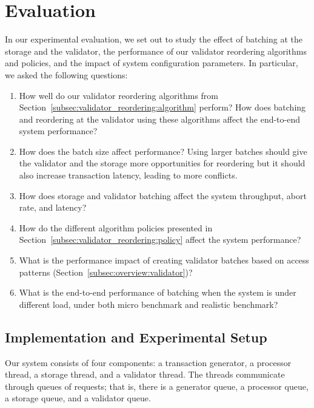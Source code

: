 \section{Evaluation}\label{sec:experiments}
In our experimental evaluation, we set out to study the effect of batching at the storage and the validator, the performance of our validator reordering algorithms and policies, and the impact of system configuration parameters. In particular, we asked the following questions:
\begin{enumerate}
\item\vspace{-.5em} How well do our validator reordering algorithms from Section~\ref{subsec:validator_reordering:algorithm} perform? How does batching and reordering at the validator using these algorithms affect the end-to-end system performance?
\item\vspace{-.5em} How does the batch size affect performance? Using larger batches should give the validator and the storage more opportunities for reordering but it should also increase transaction latency, leading to more conflicts. 
\item\vspace{-.5em} How does storage and validator batching affect the system throughput, abort rate, and latency?
\item\vspace{-.5em} How do the different algorithm policies presented in Section~\ref{subsec:validator_reordering:policy} affect the system performance?
\item\vspace{-.5em} What is the performance impact of creating validator batches based on access patterns (Section~\ref{subsec:overview:validator})?
\item\vspace{-.5em} What is the end-to-end performance of batching when the system is under different load, under both micro benchmark and realistic benchmark?
\end{enumerate}

\subsection{Implementation and Experimental Setup}
\label{subsec:experiment:implementation}

Our system consists of four components: a transaction generator, a processor thread, a storage thread, and a validator thread. The threads communicate through queues of requests; that is, there is a generator queue, a processor queue, a storage queue, and a validator queue.


